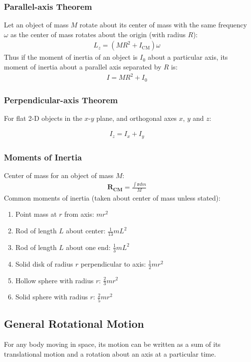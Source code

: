 \documentclass[11pt, letterpaper]{article}
\newcommand{\ve}[1]{
  \ensuremath{\bm{#1}}}	               %
\begin{document}
\begin{multicols*}{3}
\subsubsection{Parallel-axis Theorem}
Let an object of mass $M$ rotate about its center of mass with the same frequency $\omega$ as the center of mass rotates about the origin (with radius $R$):
\begin{align*}
  L_z=(MR^2+I_\text{CM})\omega
\end{align*}
Thus if the moment of inertia of an object is $I_0$ about a particular axis, its moment of inertia about a parallel axis separated by $R$ is:
\begin{align*}
  I=MR^2+I_0
\end{align*}
\subsubsection{Perpendicular-axis Theorem}
For flat 2-D objects in the $x$-$y$ plane, and orthogonal axes $x$, $y$ and $z$:

\begin{align*}
  I_z=I_x+I_y
\end{align*}
\subsubsection{Moments of Inertia}
Center of mass for an object of mass $M$:
\begin{align*}
  \ve{R_\text{CM}}=\frac{\int\ve{r}dm}{M}
\end{align*}
Common moments of inertia (taken about center of mass unless stated):
\begin{enumerate}
  \setlength{\itemsep}{2mm}
\item Point mass at $r$ from axis: $mr^2$
\item Rod of length $L$ about center: $\frac{1}{13}mL^2$
\item Rod of length $L$ about one end: $\frac{1}{3}mL^2$
\item Solid disk of radius $r$ perpendicular to axis: $\frac{1}{2}mr^2$
\item Hollow sphere with radius $r$: $\frac{2}{3}mr^2$
\item Solid sphere with radius $r$: $\frac{2}{5}mr^2$
\end{enumerate}

\subsection{General Rotational Motion}
For any body moving in space, its motion can be written as a sum of its translational motion and a rotation about an axis at a particular time. 


\end{multicols*}
\end{document}
